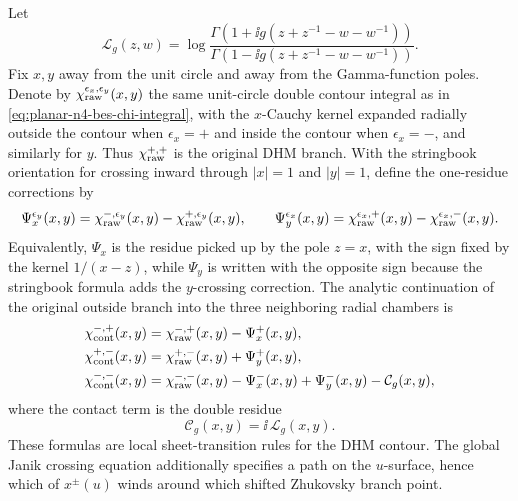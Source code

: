 \begin{proposition}
\label{prop:planar-n4-dhm-local-residue-continuation}
Let
\[
  \mathcal L_g(z,w)
  =
  \log
  \frac{\Gamma\!\left(1+\ii g(z+z^{-1}-w-w^{-1})\right)}
       {\Gamma\!\left(1-\ii g(z+z^{-1}-w-w^{-1})\right)} .
\]
Fix \(x,y\) away from the unit circle and away from the Gamma-function
poles.  Denote by \(\chi_{\rm raw}^{\epsilon_x,\epsilon_y}(x,y)\) the same
unit-circle double contour integral as in
\eqref{eq:planar-n4-bes-chi-integral}, with the \(x\)-Cauchy kernel expanded
radially outside the contour when \(\epsilon_x=+\) and inside the contour
when \(\epsilon_x=-\), and similarly for \(y\).  Thus
\(\chi_{\rm raw}^{+,+}\) is the original DHM branch.  With the stringbook
orientation for crossing inward through \(|x|=1\) and \(|y|=1\), define the
one-residue corrections by
\begin{equation}
  \Psi_x^{\epsilon_y}(x,y)
  =
  \chi_{\rm raw}^{-,\epsilon_y}(x,y)
  -
  \chi_{\rm raw}^{+,\epsilon_y}(x,y),
  \qquad
  \Psi_y^{\epsilon_x}(x,y)
  =
  \chi_{\rm raw}^{\epsilon_x,+}(x,y)
  -
  \chi_{\rm raw}^{\epsilon_x,-}(x,y).
  \label{eq:planar-n4-dhm-single-residue-definitions}
\end{equation}
Equivalently, \(\Psi_x\) is the residue picked up by the pole \(z=x\), with
the sign fixed by the kernel \(1/(x-z)\), while \(\Psi_y\) is written with
the opposite sign because the stringbook formula adds the \(y\)-crossing
correction.  The analytic continuation of the original outside branch into
the three neighboring radial chambers is
\begin{align}
  \chi^{-,+}_{\rm cont}(x,y)
  &=
  \chi_{\rm raw}^{-,+}(x,y)-\Psi_x^{+}(x,y), \\
  \chi^{+,-}_{\rm cont}(x,y)
  &=
  \chi_{\rm raw}^{+,-}(x,y)+\Psi_y^{+}(x,y), \\
  \chi^{-,-}_{\rm cont}(x,y)
  &=
  \chi_{\rm raw}^{-,-}(x,y)
  -\Psi_x^{-}(x,y)
  +\Psi_y^{-}(x,y)
  -\mathcal C_g(x,y),
  \label{eq:planar-n4-dhm-double-residue-continuation}
\end{align}
where the contact term is the double residue
\begin{equation}
  \mathcal C_g(x,y)=\ii\,\mathcal L_g(x,y).
  \label{eq:planar-n4-dhm-contact-term}
\end{equation}
These formulas are local sheet-transition rules for the DHM contour.  The
global Janik crossing equation additionally specifies a path on the
\(u\)-surface, hence which of \(x^\pm(u)\) winds around which shifted
Zhukovsky branch point.
\end{proposition}

